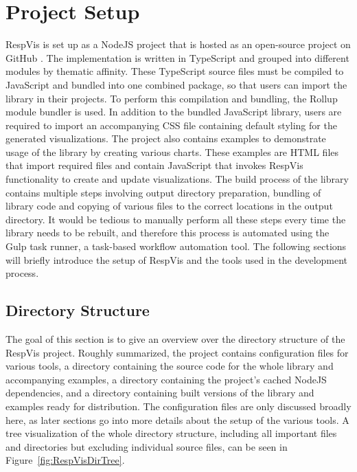 \section{Project Setup}
\label{sec:ProjectSetup}

RespVis is set up as a NodeJS \parencite{NodeJS} project that is hosted as an open-source project on GitHub \parencite{RespVisGitHub}.
The implementation is written in TypeScript and grouped into different modules by thematic affinity. 
These TypeScript source files must be compiled to JavaScript and bundled into one combined package, so that users can import the library in their projects.
To perform this compilation and bundling, the Rollup module bundler \parencite{Rollup} is used.
In addition to the bundled JavaScript library, users are required to import an accompanying CSS file containing default styling for the generated visualizations.
The project also contains examples to demonstrate usage of the library by creating various charts.
These examples are HTML files that import required files and contain JavaScript that invokes RespVis functionality to create and update visualizations.
The build process of the library contains multiple steps involving output directory preparation, bundling of library code and copying of various files to the correct locations in the output directory.
It would be tedious to manually perform all these steps every time the library needs to be rebuilt, and therefore this process is automated using the Gulp \parencite{Gulp} task runner, a task-based workflow automation tool.
The following sections will briefly introduce the setup of RespVis and the tools used in the development process.  

\subsection{Directory Structure}

The goal of this section is to give an overview over the directory structure of the RespVis project.
Roughly summarized, the project contains configuration files for various tools, a  directory containing the source code for the whole library and accompanying examples, a  directory containing the project's cached NodeJS dependencies, and a  directory containing built versions of the library and examples ready for distribution.
The configuration files are only discussed broadly here, as later sections go into more details about the setup of the various tools.
A tree visualization of the whole directory structure, including all important files and directories but excluding individual source files, can be seen in Figure~\ref{fig:RespVisDirTree}.

